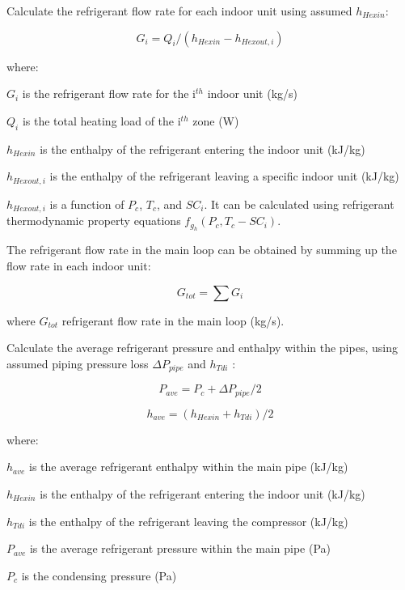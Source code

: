 Calculate the refrigerant flow rate for each indoor unit using assumed \(h_{Hexin}\):

\begin{equation}
G_i = Q_i/(h_{Hexin}-h_{Hexout,i})
\end{equation}

where:

\(G_i\) is the refrigerant flow rate for the i\(^{th}\) indoor unit (kg/s)

\(Q_i\) is the total heating load of the i\(^{th}\) zone (W)

\(h_{Hexin}\) is the enthalpy of the refrigerant entering the indoor unit (kJ/kg)

\(h_{Hexout,i}\) is the enthalpy of the refrigerant leaving a specific indoor unit (kJ/kg)

\(h_{Hexout,i}\) is a function of \(P_c\), \(T_c\), and \(SC_i\). It can be calculated using refrigerant thermodynamic property equations \(f_{g_h}(P_c,T_c-SC_i)\).

The refrigerant flow rate in the main loop can be obtained by summing up the flow rate in each indoor unit:

\begin{equation}
G_{tot} = \sum{G_i}
\end{equation}

where \(G_{tot}\) refrigerant flow rate in the main loop (kg/s).

Calculate the average refrigerant pressure and enthalpy within the pipes, using assumed piping pressure loss \(\Delta{P_{pipe}}\) and \(h_{Tdi}\) :

\begin{equation}
P_{ave} = P_c+\Delta{P_{pipe}}/2
\end{equation}

\begin{equation}
h_{ave} = (h_{Hexin}+h_{Tdi})/2
\end{equation}

where:

\(h_{ave}\) is the average refrigerant enthalpy within the main pipe (kJ/kg)

\(h_{Hexin}\) is the enthalpy of the refrigerant entering the indoor unit (kJ/kg)

\(h_{Tdi}\) is the enthalpy of the refrigerant leaving the compressor (kJ/kg)

\(P_{ave}\) is the average refrigerant pressure within the main pipe (Pa)

\(P_c\) is the condensing pressure (Pa)

